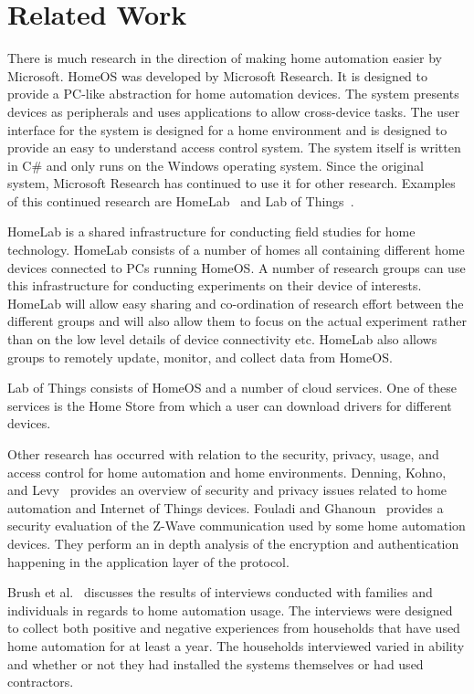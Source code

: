\section{Related Work}
\label{sec:related}
There is much research in the direction of making home automation easier by
Microsoft. HomeOS was developed by Microsoft Research. It is designed to provide
a PC-like abstraction for home automation devices. The system presents devices
as peripherals and uses applications to allow cross-device tasks. The user
interface for the system is designed for a home environment and is designed to
provide an easy to understand access control system. The system itself is
written in C\# and only runs on the Windows operating system. Since the original
system, Microsoft Research has continued to use it for other research. Examples
of this continued research are HomeLab~\cite{homeLab} and Lab of
Things~\cite{labOfThings}.

HomeLab is a shared infrastructure for conducting field studies for home
technology. HomeLab consists of a number of homes all containing different home
devices connected to PCs running HomeOS. A number of research groups can use
this infrastructure for conducting experiments on their device of interests.
HomeLab will allow easy sharing and co-ordination of research effort between the
different groups and will also allow them to focus on the actual experiment
rather than on the low level details of device connectivity etc. HomeLab also
allows groups to remotely update, monitor, and collect data from HomeOS.

Lab of Things consists of HomeOS and a number of cloud services. One of these
services is the Home Store from which a user can download drivers for different
devices.

Other research has occurred with relation to the security, privacy, usage, and
access control for home automation and home environments. Denning, Kohno, and
Levy~\cite{modernHome} provides an overview of security and privacy issues
related to home automation and Internet of Things devices. Fouladi and
Ghanoun~\cite{zwavesecurity} provides a security evaluation of the Z-Wave
communication used by some home automation devices. They perform an in depth
analysis of the encryption and authentication happening in the application layer
of the protocol.

Brush et al.~\cite{homeAutomation} discusses the results of interviews conducted
with families and individuals in regards to home automation usage. The
interviews were designed to collect both positive and negative experiences from
households that have used home automation for at least a year. The households
interviewed varied in ability and whether or not they had installed the systems
themselves or had used contractors.

